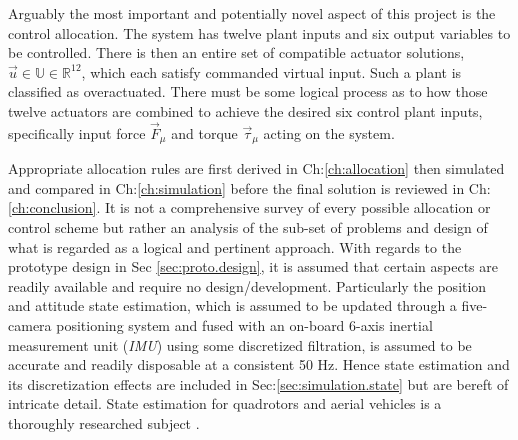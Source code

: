 \par
Arguably the most important and potentially novel aspect of this project is the control allocation. The system has twelve plant inputs and six output variables to be controlled. There is then an entire set of compatible actuator solutions, $\vec{u}\in\mathbb{U}\in\mathbb{R}^{12}$, which each satisfy commanded virtual input. Such a plant is classified as overactuated. There must be some logical process as to how those twelve actuators are combined to achieve the desired six control plant inputs, specifically input force $\vec{F}_{\mu}$ and torque $\vec{\tau}_{\mu}$ acting on the system.
\par
Appropriate allocation rules are first derived in Ch:\ref{ch:allocation} then simulated and compared in Ch:\ref{ch:simulation} before the final solution is reviewed in Ch:\ref{ch:conclusion}. It is not a comprehensive survey of every possible allocation or control scheme but rather an analysis of the sub-set of problems and design of what is regarded as a logical and pertinent approach. With regards to the prototype design in Sec \ref{sec:proto.design}, it is assumed that certain aspects are readily available and require no design/development. Particularly the position and attitude state estimation, which is assumed to be updated through a five-camera positioning system and fused with an on-board 6-axis inertial measurement unit (\emph{IMU}) using some discretized filtration, is assumed to be accurate and readily disposable at a consistent 50 Hz. Hence state estimation and its discretization effects are included in Sec:\ref{sec:simulation.state} but are bereft of intricate detail. State estimation for quadrotors and aerial vehicles is a thoroughly researched subject \cite{arnold,spacecraftkalman,attitudedetermination}.
